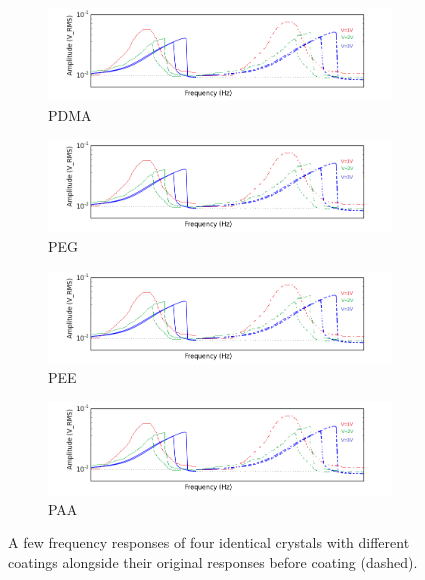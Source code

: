 \begin{figure}
	\centering
  \begin{subfigure}[b]{\textwidth}
		\includegraphics[width=\textwidth]{figures/hysteresis_excerpt_coated.png}
		\caption{PDMA}
		\label{fig:PDMA}
  \end{subfigure}
	
	  \begin{subfigure}[b]{\textwidth}
		\includegraphics[width=\textwidth]{figures/hysteresis_excerpt_coated.png}
		\caption{PEG}
		\label{fig:PEG}
  \end{subfigure}
		
	  \begin{subfigure}[b]{\textwidth}
		\includegraphics[width=\textwidth]{figures/hysteresis_excerpt_coated.png}
		\caption{PEE}
		\label{fig:PEE}
  \end{subfigure}
		
	  \begin{subfigure}[b]{\textwidth}
		\includegraphics[width=\textwidth]{figures/hysteresis_excerpt_coated.png}
		\caption{PAA}
		\label{fig:PAA}
  \end{subfigure}
	\caption{A few frequency responses of four identical crystals with different coatings alongside their original responses before coating (dashed).}
	\label{fig:hysteresis_excerpt_coatings}
\end{figure}

